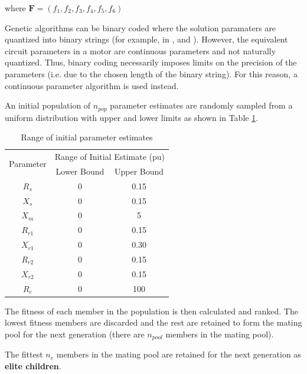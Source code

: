 \documentclass{article}
\begin{document}
\noindent where $\mathbf{F} = ( f_1, f_2, f_3, f_4, f_5, f_6 )$

Genetic algorithms can be binary coded where the solution paramaters are quantized into binary strings (for example, in \cite{nangsue_1999}, \cite{weatherford_2003} and \cite{nolan_1994}). However, the equivalent circuit parameters in a motor are continuous parameters and not naturally quantized. Thus, binary coding necessarily imposes limits on the precision of the parameters (i.e. due to the chosen length of the binary string). For this reason, a continuous parameter algorithm is used instead.

An initial population of $n_{pop}$ parameter estimates are randomly sampled from a uniform distribution with upper and lower limits as shown in Table \ref{tab:ga_range}.

\begin{table}[htp]
	\renewcommand{\arraystretch}{1.3}
	\begin{center}
	\begin{tabular}{|c|c|c|}
        \hline
		  \multirow{2}{*}{Parameter} & \multicolumn{2}{|c|}{Range of Initial Estimate (pu)} \\ \cline{2-3}
        & Lower Bound & Upper Bound \\ \hline
        $R_{s}$  	& 0  & 0.15	\\ \hline
        $X_{s}$  	& 0  & 0.15	\\ \hline
        $X_{m}$  	& 0  & 5	\\ \hline
        $R_{r1}$  	& 0  & 0.15	\\ \hline
        $X_{r1}$  	& 0  & 0.30	\\ \hline
        $R_{r2}$  	& 0  & 0.15	\\ \hline
        $X_{r2}$  	& 0  & 0.15	\\ \hline
        $R_{c}$  	& 0  & 100	\\ \hline
    \end{tabular}
	\caption{Range of initial parameter estimates}
	\label{tab:ga_range}
	\end{center}
\end{table}

The fitness of each member in the population is then calculated and ranked. The lowest fitness members are discarded and the rest are retained to form the mating pool for the next generation (there are $n_{pool}$ members in the mating pool).

The fittest $n_{e}$ members in the mating pool are retained for the next generation as \textbf{elite children}. 
\end{document}
